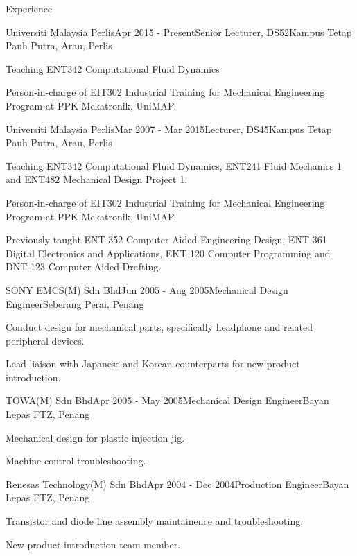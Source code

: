 \documentclass{resume} %
\begin{document}
\begin{rSection}{Experience}
\begin{rSubsection}{Universiti Malaysia Perlis}{Apr 2015 - Present}{Senior Lecturer, DS52}{Kampus Tetap Pauh Putra, Arau, Perlis}
\item Teaching ENT342 Computational Fluid Dynamics
\item Person-in-charge of EIT302 Industrial Training for Mechanical Engineering Program at PPK Mekatronik, UniMAP.
\end{rSubsection}

\begin{rSubsection}{Universiti Malaysia Perlis}{Mar 2007 - Mar 2015}{Lecturer, DS45}{Kampus Tetap Pauh Putra, Arau, Perlis}
\item Teaching ENT342 Computational Fluid Dynamics, ENT241 Fluid Mechanics 1 and ENT482 Mechanical Design Project 1.
\item Person-in-charge of EIT302 Industrial Training for Mechanical Engineering Program at PPK Mekatronik, UniMAP.
\item Previously taught ENT 352 Computer Aided Engineering Design, ENT 361 Digital Electronics and Applications, EKT 120 Computer Programming and DNT 123 Computer Aided Drafting.
\end{rSubsection}

\begin{rSubsection}{SONY EMCS(M) Sdn Bhd}{Jun 2005 - Aug 2005}{Mechanical Design Engineer}{Seberang Perai, Penang}
\item Conduct design for mechanical parts, specifically headphone and related peripheral devices.
\item Lead liaison with Japanese and Korean counterparts for new product introduction.
\end{rSubsection}

\begin{rSubsection}{TOWA(M) Sdn Bhd}{Apr 2005 - May 2005}{Mechanical Design Engineer}{Bayan Lepas FTZ, Penang}
\item Mechanical design for plastic injection jig.
\item Machine control troubleshooting.
\end{rSubsection}

\begin{rSubsection}{Renesas Technology(M) Sdn Bhd}{Apr 2004 - Dec 2004}{Production Engineer}{Bayan Lepas FTZ, Penang}
\item Transistor and diode line assembly maintainence and troubleshooting.
\item New product introduction team member.
\end{rSubsection}


\end{rSection}
\end{document}
